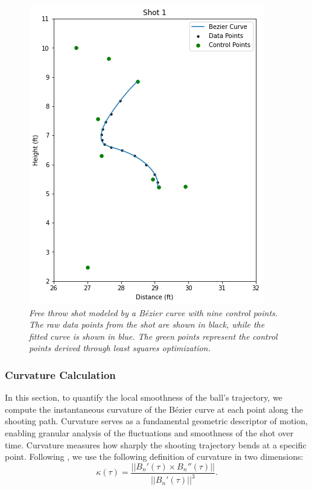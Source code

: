 \documentclass{article}
\begin{document}
            \begin{figure}[H]
                \centering
                \includegraphics[scale=0.4]{articles/figures/shot1.png}
                \caption{\it Free throw shot modeled by a Bézier curve with nine control points. The raw data points from the shot are shown in black, while the fitted curve is shown in blue. The green points represent the control points derived through least squares optimization.}
                \label{fig:free-throw-bezier}
            \end{figure}

        \subsubsection{Curvature Calculation}

          In this section, to quantify the local smoothness of the ball’s trajectory, we compute the instantaneous curvature of the Bézier curve at each point along the shooting path. Curvature serves as a fundamental geometric descriptor of motion, enabling granular analysis of the fluctuations and smoothness of the shot over time. Curvature measures how sharply the shooting trajectory bends at a specific point. Following \citet{slegers_role_2024}, we use the following definition of curvature in two dimensions:
          \[
            \kappa(\tau) = \frac{||B_n'(\tau) \times B_n''(\tau)||}{||B_n'(\tau)||^3}.
          \]
          
\end{document}
